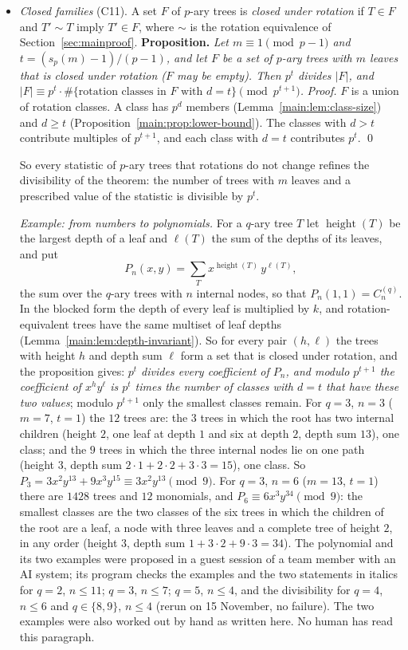 \documentclass[11pt]{article}
\theoremstyle{definition}
\theoremstyle{remark}
\numberwithin{equation}{section}
\numberwithin{figure}{section}
\begin{document}
\begin{itemize}[itemsep=1pt]
\item \emph{Closed families} (C11). A set $F$ of $p$-ary trees is \emph{closed under rotation} if $T\in F$
 and $T'\sim T$ imply $T'\in F$, where $\sim$ is the rotation equivalence of Section~\ref{sec:mainproof}.
 \textbf{Proposition.} \emph{Let $m\equiv1\pmod{p-1}$ and $t=(s_p(m)-1)/(p-1)$, and let $F$ be a set of
 $p$-ary trees with $m$ leaves that is closed under rotation ($F$ may be empty). Then $p^t$ divides $|F|$, and
 $|F|\equiv p^t\cdot\#\{\text{rotation classes in }F\text{ with }d=t\}\pmod{p^{t+1}}$.}
 \emph{Proof.} $F$ is a union of rotation classes. A class has $p^{d}$ members
 (Lemma~\ref{main:lem:class-size}) and $d\ge t$ (Proposition~\ref{main:prop:lower-bound}). The classes with
 $d>t$ contribute multiples of $p^{t+1}$, and each class with $d=t$ contributes $p^t$. \qed

 So every statistic of $p$-ary trees that rotations do not change refines the divisibility of the theorem: the
 number of trees with $m$ leaves and a prescribed value of the statistic is divisible by $p^t$.

 \emph{Example: from numbers to polynomials.} For a $q$-ary tree $T$ let $\operatorname{height}(T)$ be the
 largest depth of a leaf and $\ell(T)$ the sum of the depths of its leaves, and put
 \[
  P_n(x,y)=\sum_{T}x^{\operatorname{height}(T)}\,y^{\ell(T)},
 \]
 the sum over the $q$-ary trees with $n$ internal nodes, so that $P_n(1,1)=C_n^{(q)}$. In the blocked form the
 depth of every leaf is multiplied by $k$, and rotation-equivalent trees have the same multiset of leaf depths
 (Lemma~\ref{main:lem:depth-invariant}). So for every pair $(h,\ell)$ the trees with height $h$ and depth sum
 $\ell$ form a set that is closed under rotation, and the proposition gives: \emph{$p^t$ divides every
 coefficient of $P_n$, and modulo $p^{t+1}$ the coefficient of $x^hy^{\ell}$ is $p^t$ times the number of
 classes with $d=t$ that have these two values}; modulo $p^{t+1}$ only the smallest classes remain. For $q=3$,
 $n=3$ ($m=7$, $t=1$) the $12$ trees are: the $3$ trees in which the root has two internal children (height
 $2$, one leaf at depth $1$ and six at depth $2$, depth sum $13$), one class; and the $9$ trees in which the
 three internal nodes lie on one path (height $3$, depth sum $2\cdot1+2\cdot2+3\cdot3=15$), one class. So
 $P_3=3x^2y^{13}+9x^3y^{15}\equiv3x^2y^{13}\pmod 9$. For $q=3$, $n=6$ ($m=13$, $t=1$) there are $1428$ trees
 and $12$ monomials, and $P_6\equiv6x^3y^{34}\pmod 9$: the smallest classes are the two classes of the six
 trees in which the children of the root are a leaf, a node with three leaves and a complete tree of height
 $2$, in any order (height $3$, depth sum $1+3\cdot2+9\cdot3=34$). The polynomial and its two examples were
 proposed in a guest session of a team member with an AI system; its program checks the examples and the two
 statements in italics for $q=2$, $n\le11$; $q=3$, $n\le7$; $q=5$, $n\le4$, and the divisibility for $q=4$,
 $n\le6$ and $q\in\{8,9\}$, $n\le4$ (rerun on 15 November, no failure). The two examples were also worked out
 by hand as written here. No human has read this paragraph.


\end{itemize}
\end{document}
